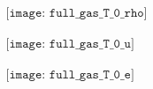 \documentclass[11pt,reqno]{article}
\begin{document}
\begin{figure}[htbp]
 \begin{center}
$
\begin{array}{lcr}
\texttt{[image: full\_gas\_T\_0\_rho]}
\end{array}
$
\end{center}
\caption{}
\end{figure}



\begin{figure}[htbp]
 \begin{center}
$
\begin{array}{lcr}
\texttt{[image: full\_gas\_T\_0\_u]}
\end{array}
$
\end{center}
\caption{}
\end{figure}



\begin{figure}[htbp]
 \begin{center}
$
\begin{array}{lcr}
\texttt{[image: full\_gas\_T\_0\_e]}
\end{array}
$
\end{center}
\caption{}
\end{figure}
\end{document}
